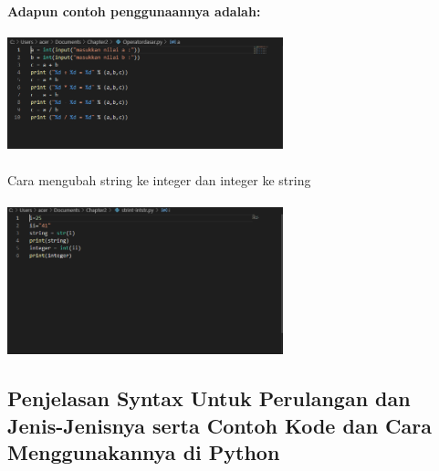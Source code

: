 \documentclass{article}
\begin{document}
\paragraph{Adapun contoh penggunaannya adalah: }
\newpage\centerline{\includegraphics[width=8cm]{figure/C.PNG}}
\paragraph{} 
\paragraph{} Cara mengubah string ke integer dan integer ke string
\paragraph{}
    \centerline{\includegraphics[width=8cm]{figure/C1.PNG}}
    
\subsection{Penjelasan Syntax Untuk Perulangan dan Jenis-Jenisnya serta Contoh Kode dan Cara Menggunakannya di Python}
\end{document}
